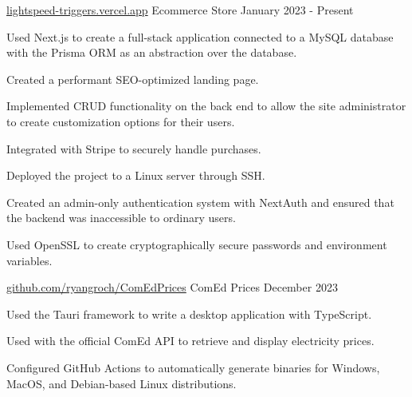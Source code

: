 

\begin{cventries}

  \cventry
    {\href{https://lightspeed-triggers.vercel.app}{lightspeed-triggers.vercel.app}} %
    {Ecommerce Store} %
    {January 2023 - Present} %
    {} %
    {
      \begin{cvitems} %
        \item {Used Next.js to create a full-stack application connected to a MySQL database with the Prisma ORM as an abstraction over the database.}
        \item {Created a performant SEO-optimized landing page.}
        \item {Implemented CRUD functionality on the back end to allow the site administrator to create customization options for their users.}
        \item {Integrated with Stripe to securely handle purchases.}
        \item {Deployed the project to a Linux server through SSH.}
        \item {Created an admin-only authentication system with NextAuth and ensured that the backend was inaccessible to ordinary users.}
        \item {Used OpenSSL to create cryptographically secure passwords and environment variables.}
      \end{cvitems}
    }


  \cventry
  {\href{https://github.com/ryangroch/ComEdPrices}{github.com/ryangroch/ComEdPrices}} %
  {ComEd Prices} %
  {December 2023} %
  {} %
  {
    \begin{cvitems} %
      \item {Used the Tauri framework to write a desktop application with TypeScript.}
      \item {Used with the official ComEd API to retrieve and display electricity prices.}
      \item {Configured GitHub Actions to automatically generate binaries for Windows, MacOS, and Debian-based Linux distributions.}
    \end{cvitems}
  }


\end{cventries}
